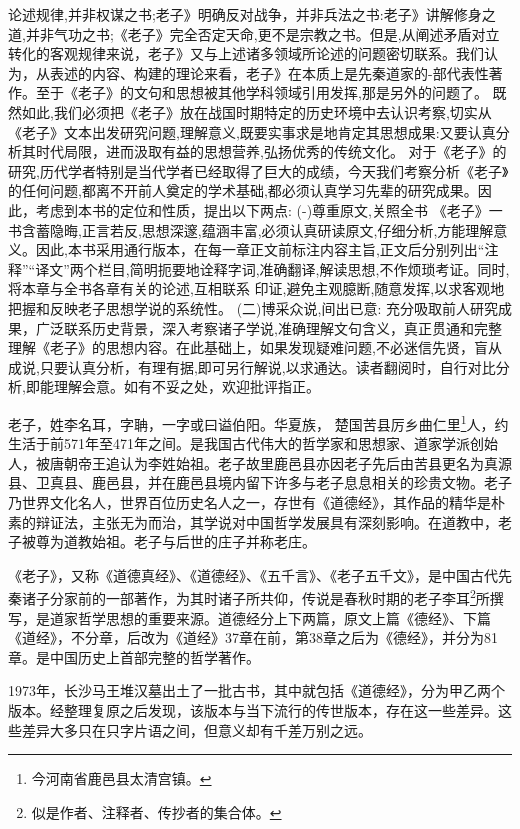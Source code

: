 \documentclass[a4paper,12pt,UTF8,twoside]{ctexbook}
\begin{document}
论述规律,并非权谋之书;老子》明确反对战争，并非兵法之书:老子》讲解修身之道,并非气功之书;《老子》完全否定天命,更不是宗教之书。但是,从阐述矛盾对立转化的客观规律来说，老子》又与上述诸多领域所论述的问题密切联系。我们认为，从表述的内容、构建的理论来看，老子》在本质上是先秦道家的-部代表性著作。至于《老子》的文句和思想被其他学科领域引用发挥,那是另外的问题了。
既然如此,我们必须把《老子》放在战国时期特定的历史环境中去认识考察,切实从《老子》文本出发研究问题,理解意义,既要实事求是地肯定其思想成果:又要认真分析其时代局限，进而汲取有益的思想营养,弘扬优秀的传统文化。
对于《老子》的研究,历代学者特别是当代学者已经取得了巨大的成绩，今天我们考察分析《老子》的任何问题,都离不开前人奠定的学术基础,都必须认真学习先辈的研究成果。因此，考虑到本书的定位和性质，提出以下两点:
(-)尊重原文,关照全书
《老子》一书含蓄隐晦,正言若反,思想深邃,蕴涵丰富,必须认真研读原文,仔细分析,方能理解意义。因此,本书采用通行版本，在每一章正文前标注内容主旨,正文后分别列出“注释”“译文”两个栏目,简明扼要地诠释字词,准确翻译,解读思想,不作烦琐考证。同时,将本章与全书各章有关的论述,互相联系
印证,避免主观臆断,随意发挥,以求客观地把握和反映老子思想学说的系统性。
(二)博采众说,间出已意:
充分吸取前人研究成果，广泛联系历史背景，深入考察诸子学说,准确理解文句含义，真正贯通和完整理解《老子》的思想内容。在此基础上，如果发现疑难问题,不必迷信先贤，盲从成说,只要认真分析，有理有据,即可另行解说,以求通达。读者翻阅时，自行对比分析,即能理解会意。如有不妥之处，欢迎批评指正。
	
	老子，姓李名耳，字聃，一字或曰谥伯阳。华夏族， 楚国苦县厉乡曲仁里\footnote{今河南省鹿邑县太清宫镇。}人，约生活于前571年至471年之间。是我国古代伟大的哲学家和思想家、道家学派创始人，被唐朝帝王追认为李姓始祖。老子故里鹿邑县亦因老子先后由苦县更名为真源县、卫真县、鹿邑县，并在鹿邑县境内留下许多与老子息息相关的珍贵文物。老子乃世界文化名人，世界百位历史名人之一，存世有《道德经》，其作品的精华是朴素的辩证法，主张无为而治，其学说对中国哲学发展具有深刻影响。在道教中，老子被尊为道教始祖。老子与后世的庄子并称老庄。
	
	《老子》，又称《道德真经》、《道德经》、《五千言》、《老子五千文》，是中国古代先秦诸子分家前的一部著作，为其时诸子所共仰，传说是春秋时期的老子李耳\footnote{似是作者、注释者、传抄者的集合体。}所撰写，是道家哲学思想的重要来源。道德经分上下两篇，原文上篇《德经》、下篇《道经》，不分章，后改为《道经》37章在前，第38章之后为《德经》，并分为81章。是中国历史上首部完整的哲学著作。 
	
	1973年，长沙马王堆汉墓出土了一批古书，其中就包括《道德经》，分为甲乙两个版本。经整理复原之后发现，该版本与当下流行的传世版本，存在这一些差异。这些差异大多只在只字片语之间，但意义却有千差万别之远。
	
\end{document}

